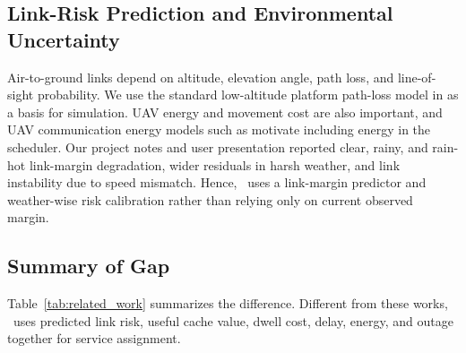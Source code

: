 \subsection{Link-Risk Prediction and Environmental Uncertainty}
Air-to-ground links depend on altitude, elevation angle, path loss, and line-of-sight probability. We use the standard low-altitude platform path-loss model in \cite{alhourani2014lap} as a basis for simulation. UAV energy and movement cost are also important, and UAV communication energy models such as \cite{zeng2019rotary} motivate including energy in the scheduler. Our project notes and user presentation reported clear, rainy, and rain-hot link-margin degradation, wider residuals in harsh weather, and link instability due to speed mismatch. Hence, \pchorch\ uses a link-margin predictor and weather-wise risk calibration rather than relying only on current observed margin.

\subsection{Summary of Gap}
Table~\ref{tab:related_work} summarizes the difference. Different from these works, \pchorch\ uses predicted link risk, useful cache value, dwell cost, delay, energy, and outage together for service assignment.


